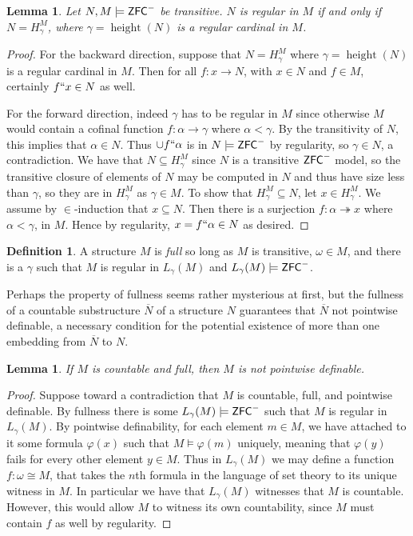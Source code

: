 \documentclass{amsart}
\newtheorem{lemma}[theorem]{Lemma}
\theoremstyle{definition}
\newtheorem{definition}[theorem]{Definition}
\theoremstyle{remark}
\newcommand{\N}{{\overline{N}}}
\newcommand{\ZFC}{\textup{\ensuremath{\textsf{ZFC}}}}
\DeclareMathOperator{\height}{height}
\newcommand{\To}{\longrightarrow}
\begin{document}
\begin{lemma} \label{lemma:regularityequiv}
Let $N, M \models \ZFC^-$ be transitive. $N$ is regular in $M$ if and only if $N = H_\gamma^M$, where $\gamma = \height(N)$ is a regular cardinal in $M$. 
\end{lemma}
\begin{proof}
For the backward direction, suppose that $N=H_\gamma^M$ where $\gamma = \height(N)$ is a regular cardinal in $M$. Then for all $f: x \To N$, with $x \in N$ and $f \in M$, certainly $f``x \in N$ as well.

For the forward direction, indeed $\gamma$ has to be regular in $M$ since otherwise $M$ would contain a cofinal function $f: \alpha \To \gamma$ where $\alpha < \gamma$. By the transitivity of $N$, this implies that $\alpha \in N$. Thus $\cup f``\alpha$ is in $N \models \ZFC^-$ by regularity, so $\gamma \in N$, a contradiction.
We have that $N \subseteq H_{\gamma}^M$ since $N$ is a transitive $\ZFC^-$ model, so the transitive closure of elements of $N$ may be computed in $N$ and thus have size less than $\gamma$, so they are in $H_\gamma^M$ as $\gamma \in M$. To show that $H_{\gamma}^M \subseteq N$, let $x \in H_{\gamma}^M$. We assume by $\in$-induction that $x \subseteq N$. Then there is a surjection $f: \alpha \twoheadrightarrow x$ where $\alpha < \gamma$, in $M$. Hence by regularity, $x = f``\alpha \in N$ as desired.
\end{proof}

\begin{definition} A structure $M$ is \emph{full} so long as $M$ is transitive, $\omega \in M$, and there is a $\gamma$ such that $M$ is regular in $L_\gamma(M)$ and $L_\gamma(M) \models \ZFC^-$.
\end{definition}

Perhaps the property of fullness seems rather mysterious at first, but the fullness of a countable substructure $\N$ of a structure $N$ guarantees that $\N$ not pointwise definable, a necessary condition for the potential existence
of more than one embedding from $\N$ to $N$.

\begin{lemma} If $M$ is countable and full, then $M$ is not pointwise definable. \end{lemma}
\begin{proof} Suppose toward a contradiction that $M$ is countable, full, and pointwise definable. By fullness there is some $L_\gamma(M) \models \ZFC^-$ such that $M$ is regular in $L_\gamma(M)$. By pointwise definability, for each element $m \in M$, we have attached to it some formula $\varphi(x)$ such that $M \models \varphi(m)$ uniquely, meaning that $\varphi(y)$ fails for every other element $y \in M$. Thus in $L_\gamma(M)$ we may define a function $f: \omega \cong M$, that takes the $n$th formula in the language of set theory to its unique witness in $M$. In particular we have that $L_\gamma(M)$ witnesses that $M$ is countable. However, this would allow $M$ to witness its own countability, since $M$ must contain $f$ as well by regularity. \end{proof} 
\end{document}
